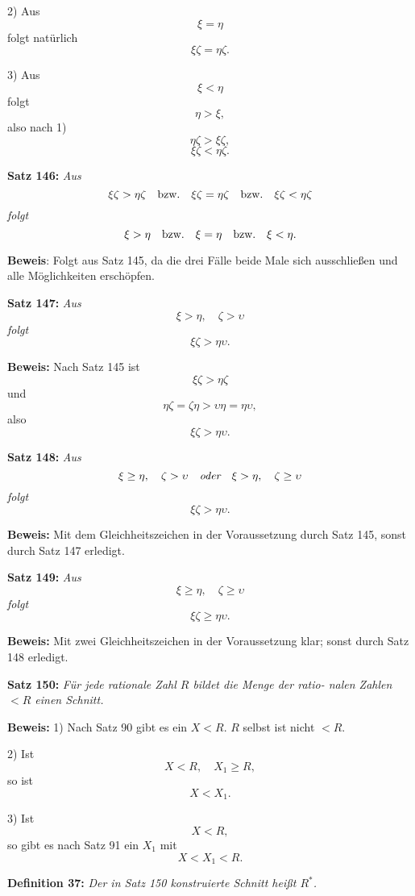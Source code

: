 2) Aus
$$\xi = \eta$$
folgt nat\"urlich
$$\xi\zeta = \eta\zeta.$$

3) Aus
$$\xi < \eta$$
folgt
$$\eta > \xi,$$
also nach 1)
$$\eta\zeta > \xi\zeta,$$
$$\xi\zeta < \eta\zeta.$$
\medskip


{\bf Satz 146:} {\it Aus
$$\xi\zeta > \eta\zeta\quad\hbox{bzw.}\quad \xi\zeta = \eta\zeta\quad\hbox{bzw.}\quad \xi\zeta < \eta\zeta$$
folgt
$$\xi > \eta\quad\hbox{bzw.}\quad \xi = \eta\quad\hbox{bzw.}\quad \xi < \eta.$$}%

{\bf Beweis}: Folgt aus Satz 145, da die drei F\"alle beide Male
sich ausschlie{\ss}en und alle M\"oglichkeiten ersch\"opfen.
\medskip


{\bf Satz 147:} {\it Aus
$$\xi > \eta,\quad \zeta > \upsilon$$
folgt
$$\xi\zeta > \eta\upsilon.$$}%

{\bf Beweis:} Nach Satz 145 ist
$$\xi\zeta > \eta\zeta$$
und
$$\eta\zeta = \zeta\eta > \upsilon\eta = \eta\upsilon,$$
also
$$\xi\zeta > \eta\upsilon.$$
\medskip


{\bf Satz 148:} {\it Aus
$$\xi \ge \eta,\quad \zeta > \upsilon\quad\hbox{\it oder}\quad \xi > \eta,\quad \zeta \ge \upsilon$$
folgt
$$\xi\zeta > \eta\upsilon.$$}%

{\bf Beweis:} Mit dem Gleichheitszeichen in der Voraussetzung
durch Satz 145, sonst durch Satz 147 erledigt.
\medskip


{\bf Satz 149:} {\it Aus
$$\xi \ge \eta,\quad \zeta \ge \upsilon$$
folgt
$$\xi\zeta \ge \eta\upsilon.$$}%

{\bf Beweis:} Mit zwei Gleichheitszeichen in der Voraussetzung
klar; sonst durch Satz 148 erledigt.
\medskip


{\bf Satz 150:} {\it F\"ur jede rationale Zahl $R$ bildet die Menge der ratio-
nalen Zahlen $< R$ einen Schnitt.}

{\bf Beweis:} 1) Nach Satz 90 gibt es ein $X < R$.  $R$ selbst ist
nicht $< R$.

2) Ist
$$X < R,\quad X_1 \ge R,$$
so ist
$$X < X_1.$$

3) Ist
$$X < R,$$
so gibt es nach Satz 91 ein $X_1$ mit
$$X < X_1 < R.$$
\medskip

{\bf Definition 37:} {\it Der in Satz 150 konstruierte Schnitt hei{\ss}t $R^*$.}

